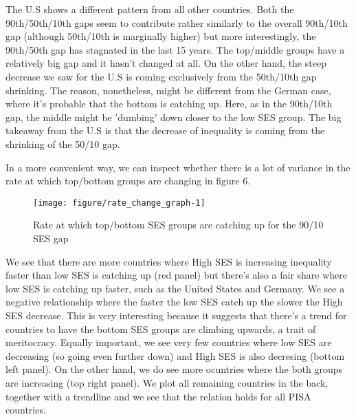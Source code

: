 \documentclass[11pt, a4paper]{article}\usepackage[]{graphicx}\usepackage[]{color}
\begin{document}
The U.S shows a different pattern from all other countries. Both the 90th/50th/10th gaps seem to contribute rather similarly to the overall 90th/10th gap (although 50th/10th is marginally higher) but more interestingly, the 90th/50th gap has stagnated in the last 15 years. The top/middle groups have a relatively big gap and it hasn't changed at all. On the other hand, the steep decrease we saw for the U.S is coming exclusively from the 50th/10th gap shrinking. The reason, nonetheless, might be different from the German case, where it's probable that the bottom is catching up. Here, as in the 90th/10th gap, the middle might be 'dumbing' down closer to the low SES group. The big takeaway from the U.S is that the decrease of inequality is coming from the shrinking of the 50/10 gap.

In a more convenient way, we can inspect whether there is a lot of variance in the rate at which top/bottom groups are changing in figure 6.



\begin{figure}
\begin{center}


{\centering \texttt{[image: figure/rate\_change\_graph-1]} 

}



\caption{Rate at which top/bottom SES groups are catching up for the 90/10 SES gap}
\end{center}
\end{figure}

We see that there are more countries where High SES is increasing inequality faster than low SES is catching up (red panel) but there's also a fair share where low SES is catching up faster, such as the United States and Germany. We see a negative relationship where the faster the low SES catch up the slower the High SES decrease. This is very interesting because it suggests that there's a trend for countries to have the bottom SES groups are climbing upwards, a trait of meritocracy. Equally important, we see very few countries where low SES are decreasing (so going even further down) and High SES is also decresing (bottom left panel). On the other hand, we do see more ocuntries where the both groups are increasing (top right panel). We plot all remaining countries in the back, together with a trendline and we see that the relation holds for all PISA countries.
\end{document}
